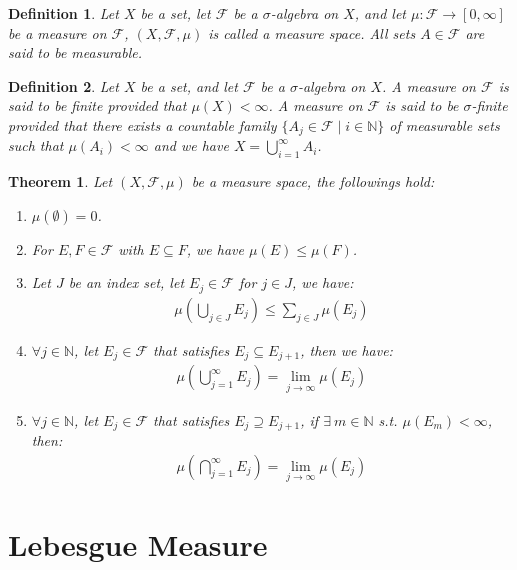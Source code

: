 \documentclass[11pt]{book}
\theoremstyle{break}
\theoremstyle{break}
\newtheorem{thm}{Theorem}[section]
\newtheorem{defn}{Definition}[corL]
\newcommand{\N}{\mathbb{N}}
\newcommand{\F}{\mathcal{F}}
\begin{document}
\begin{defn}
Let $X$ be a set, let $\F$ be a $\sigma$-algebra on $X$, and let $\mu:\F \to [0,\infty]$ be a measure on $\F$, $(X,\F,\mu)$ is called a measure space. All sets $A \in \F$ are said to be measurable. 
\end{defn}

\begin{defn}
Let $X$ be a set, and let $\F$ be a $\sigma$-algebra on $X$. A measure on $\F$ is said to be finite provided that $\mu(X)<\infty$. A measure on $\F$ is said to be $\sigma$-finite provided that there exists a countable family $\{A_j \in \F \mid  i\in \N\}$ of measurable sets such that $\mu(A_i) <\infty$ and we have $X = \bigcup_{i=1}^\infty A_i$.  
\end{defn}


\begin{thm}
Let $(X,\F, \mu)$ be a measure space, the followings hold:
\begin{enumerate}[topsep=3pt,itemsep=-1ex,partopsep=1ex,parsep=1ex]
\item $\mu(\emptyset) = 0$.
\item For $E,F\in \F$ with $E \subseteq F$, we have $\mu(E) \leq \mu(F)$.
\item Let $J$ be an index set, let $E_j \in \F$ for $j \in J$, we have: 
	\begin{align*}
	\mu\left(\bigcup_{j\in J}E_j\right) \leq \sum_{j\in J} \mu(E_j)
	\end{align*}
\item $\forall j \in \N$, let $E_j \in \F$ that satisfies  $E_{j} \subseteq E_{j+1}$, then we have:
	\begin{align*}
	\mu\left(\bigcup_{j=1}^\infty E_j\right) = \lim_{j\to \infty}\mu(E_j)
	\end{align*}
\item $\forall j \in \N$, let $E_j \in \F$ that satisfies $E_{j} \supseteq E_{j+1}$, if $\exists\ m \in \N$ s.t. $\mu(E_m)<\infty$, then:
	\begin{align*}
	\mu\left( \bigcap_{j=1}^\infty E_j\right) = \lim_{j\to \infty}\mu(E_j)
	\end{align*}
\end{enumerate}
\end{thm}

\newpage
\section[Lebesgue Measure]{\color{red} Lebesgue Measure\color{black}}
\end{document}

